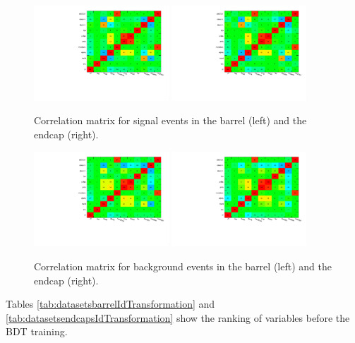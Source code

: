 \begin{figure}
  \centering
  \includegraphics[width=0.45\textwidth]{Figures/correlationMatrixS_barrel}
  \label{fig:matrixSBarrel}
  \includegraphics[width=0.45\textwidth]{Figures/correlationMatrixS_endcaps}
  \label{fig:matrixSEndcaps}
  \caption{Correlation matrix for signal events in the barrel (left) and the endcap (right).}
  \label{fig:correlationMatricesSignal}
\end{figure}

\begin{figure}
  \centering
  \includegraphics[width=0.45\textwidth]{Figures/correlationMatrixB_barrel}
  \label{fig:matrixBBarrel}
  \includegraphics[width=0.45\textwidth]{Figures/correlationMatrixB_endcaps}
  \label{fig:matrixBEndcaps}
  \caption{Correlation matrix for background events in the barrel (left) and the endcap (right).}
  \label{fig:correlationMatricesBackground}
\end{figure}

Tables \ref{tab:datasetsbarrelIdTransformation} and \ref{tab:datasetsendcapsIdTransformation} show the ranking of variables before
the BDT training.





%
%
